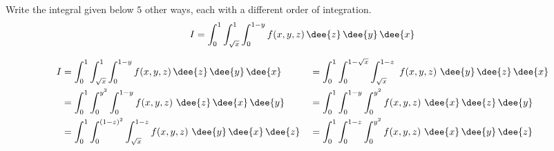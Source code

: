 \begin{question}[M200 2008A] %
Write the integral given below $5$ other ways, each with a different 
order of integration.
\begin{equation*}
I=\int_0^1 \int_{\sqrt{x}}^1 \int_0^{1-y} f(x,y,z)\,\dee{z}\,\dee{y}\,\dee{x}
\end{equation*}
\end{question}

%

\begin{answer}
\begin{alignat*}{3}
I&= \int_0^1 \int_{\sqrt{x}}^1 \int_0^{1-y} f(x,y,z)\,\dee{z}\,\dee{y}\,\dee{x}
&&=\int_0^1 \int_0^{1-\sqrt{x}} \int_{\sqrt{x}}^{1-z}
                \ f(x,y,z)\  \dee{y}\,\dee{z}\,\dee{x} \\
&=\int_0^1  \int_0^{y^2}\int_0^{1-y}f(x,y,z)\ 
                   \dee{z}\,\dee{x}\, \dee{y}
&&=\int_0^1  \int_0^{1-y} \int_0^{y^2} f(x,y,z)\ 
                   \dee{x}\, \dee{z}\,\dee{y} \\
&=\int_0^1  \int_0^{(1-z)^2} \int_{\sqrt{x}}^{1-z}f(x,y,z)\ 
                   \dee{y}\,\dee{x}\, \dee{z}
&&=\int_0^1  \int_0^{1-z} \int_0^{y^2} f(x,y,z)\ 
                   \dee{x}\, \dee{y}\,\dee{z}
\end{alignat*}
\end{answer}

